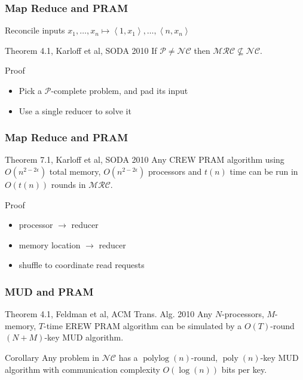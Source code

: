 \documentclass[12pt,aspectratio=169]{beamer}
\DeclareMathOperator{\poly}{\text{poly}}
\DeclareMathOperator{\polylog}{\text{polylog}}
\begin{document}
\begin{frame}\frametitle{Map Reduce and PRAM}

\begin{block}{Reconcile inputs}
  $x_{1}, \ldots , x_{n} \mapsto \left\langle 1, x_{1} \right\rangle, \ldots ,
\left\langle n,x_{n} \right\rangle $
\end{block}

\begin{block}{Theorem 4.1, Karloff et al, SODA 2010}
  If $\mathcal{P} \neq \mathcal{NC}$ then $\mathcal{MRC} \not\subseteq
  \mathcal{NC}$.
\end{block}

\begin{block}{Proof}
  \begin{itemize}
  \item
    Pick a $\mathcal{P}$-complete problem, and pad its input
  \item
    Use a single reducer to solve it
  \end{itemize}
\end{block}
\end{frame}


\begin{frame}\frametitle{Map Reduce and PRAM}
\begin{block}{Theorem 7.1, Karloff et al, SODA 2010}
Any CREW PRAM algorithm using
$O(n^{2-2\epsilon})$ total memory, $O(n^{2-2\epsilon})$ processors and $t(n)$
time can be run in $O(t(n))$ rounds in $\mathcal{MRC}$.
\end{block}

\begin{block}{Proof}
  \begin{itemize}
  \item
    processor $\to$ reducer
  \item
    memory location $\to$ reducer
  \item
    shuffle to coordinate read requests
  \end{itemize}
\end{block}
\end{frame}


\begin{frame}\frametitle{MUD and PRAM}
\begin{block}{Theorem 4.1, Feldman et al, ACM Trans.
 Alg. 2010}
Any $N$-processors, $M$-memory, $T$-time EREW PRAM algorithm can be simulated
by a $O(T)$-round $(N+M)$-key MUD algorithm.
\end{block}

\begin{block}{Corollary}
  Any problem in $\mathcal{NC}$ has a $\polylog(n)$-round, $\poly(n)$-key MUD
  algorithm with communication complexity $O(\log(n))$ bits per key.
\end{block}
\end{frame}
\end{document}

